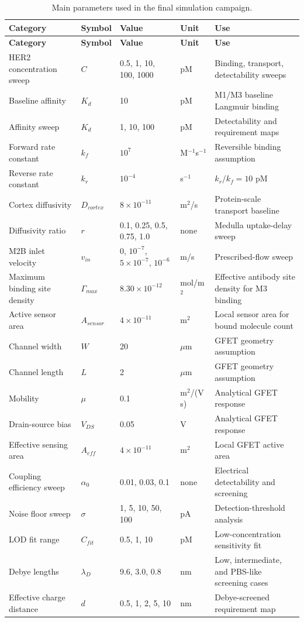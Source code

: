 
\begingroup\small\setlength{\tabcolsep}{3pt}
\begin{longtable}{@{}p{}p{}p{}p{}p{}@{}}
\caption{Main parameters used in the final simulation campaign.}\label{tab:parameters}\\
\toprule
\textbf{Category} & \textbf{Symbol} & \textbf{Value} & \textbf{Unit} & \textbf{Use}\\
\midrule
\endfirsthead
\toprule
\textbf{Category} & \textbf{Symbol} & \textbf{Value} & \textbf{Unit} & \textbf{Use}\\
\midrule
\endhead
HER2 concentration sweep & $C$ & 0.5, 1, 10, 100, 1000 & pM & Binding, transport, detectability sweeps\\
Baseline affinity & $K_d$ & 10 & pM & M1/M3 baseline Langmuir binding\\
Affinity sweep & $K_d$ & 1, 10, 100 & pM & Detectability and requirement maps\\
Forward rate constant & $k_f$ & $10^7$ & M$^{-1}$s$^{-1}$ & Reversible binding assumption\\
Reverse rate constant & $k_r$ & $10^{-4}$ & s$^{-1}$ & $k_r/k_f = 10$ pM\\
Cortex diffusivity & $D_{cortex}$ & $8\times10^{-11}$ & m$^2$/s & Protein-scale transport baseline\\
Diffusivity ratio & $r$ & 0.1, 0.25, 0.5, 0.75, 1.0 & none & Medulla uptake-delay sweep\\
M2B inlet velocity & $v_{in}$ & 0, $10^{-7}$, $5\times10^{-7}$, $10^{-6}$ & m/s & Prescribed-flow sweep\\
Maximum binding site density & $\Gamma_{max}$ & $8.30\times10^{-12}$ & mol/m$^2$ & Effective antibody site density for M3 binding\\
Active sensor area & $A_{sensor}$ & $4\times10^{-11}$ & m$^2$ & Local sensor area for bound molecule count\\
Channel width & $W$ & 20 & $\mu$m & GFET geometry assumption\\
Channel length & $L$ & 2 & $\mu$m & GFET geometry assumption\\
Mobility & $\mu$ & 0.1 & m$^2$/(V s) & Analytical GFET response\\
Drain-source bias & $V_{DS}$ & 0.05 & V & Analytical GFET response\\
Effective sensing area & $A_{eff}$ & $4\times10^{-11}$ & m$^2$ & Local GFET active area\\
Coupling efficiency sweep & $\alpha_0$ & 0.01, 0.03, 0.1 & none & Electrical detectability and screening\\
Noise floor sweep & $\sigma$ & 1, 5, 10, 50, 100 & pA & Detection-threshold analysis\\
LOD fit range & $C_{fit}$ & 0.5, 1, 10 & pM & Low-concentration sensitivity fit\\
Debye lengths & $\lambda_D$ & 9.6, 3.0, 0.8 & nm & Low, intermediate, and PBS-like screening cases\\
Effective charge distance & $d$ & 0.5, 1, 2, 5, 10 & nm & Debye-screened requirement map\\
\bottomrule
\end{longtable}
\endgroup
